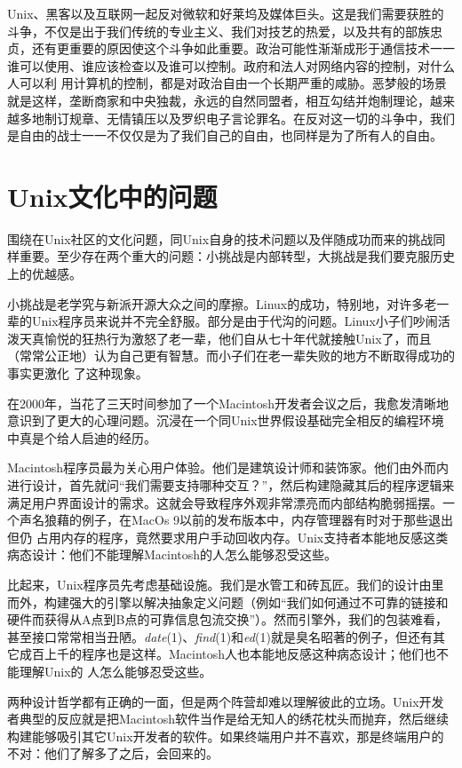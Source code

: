 \documentclass[12pt,oneside]{book}
\begin{document}
Unix、黑客以及互联网一起反对微软和好莱坞及媒体巨头。这是我们需要获胜的斗争，不仅是出于我们传统的专业主义、我们对技艺的热爱，以及共有的部族忠贞，还有更重要的原因使这个斗争如此重要。政治可能性渐渐成形于通信技术一一谁可以使用、谁应该检查以及谁可以控制。政府和法人对网络内容的控制，对什么人可以利
用计算机的控制，都是对政治自由一个长期严重的咸胁。恶梦般的场景就是这样，垄断商家和中央独裁，永远的自然同盟者，相互勾结并炮制理论，越来越多地制订规章、无情镇压以及罗织电子言论罪名。在反对这一切的斗争中，我们是自由的战士一一不仅仅是为了我们自己的自由，也同样是为了所有人的自由。

\section{Unix文化中的问题}
围绕在Unix社区的文化问题，同Unix自身的技术问题以及伴随成功而来的挑战同样重要。至少存在两个重大的问题：小挑战是内部转型，大挑战是我们要克服历史上的优越感。

小挑战是老学究与新派开源大众之间的摩擦。Linux的成功，特别地，对许多老一辈的Unix程序员来说并不完全舒服。部分是由于代沟的问题。Linux小子们吵闹活泼天真愉悦的狂热行为激怒了老一辈，他们自从七十年代就接触Unix了，而且（常常公正地）认为自己更有智慧。而小子们在老一辈失败的地方不断取得成功的事实更激化
了这种现象。

在2000年，当花了三天时间参加了一个Macintosh开发者会议之后，我愈发清晰地意识到了更大的心理问题。沉浸在一个同Unix世界假设基础完全相反的编程环境中真是个给人启迪的经历。

Macintosh程序员最为关心用户体验。他们是建筑设计师和装饰家。他们由外而内进行设计，首先就问“我们需要支持哪种交互？”，然后构建隐藏其后的程序逻辑来满足用户界面设计的需求。这就会导致程序外观非常漂亮而内部结构脆弱摇摆。一个声名狼藉的例子，在MacOs 9以前的发布版本中，内存管理器有时对于那些退出但仍
占用内存的程序，竟然要求用户手动回收内存。Unix支持者本能地反感这类病态设计：他们不能理解Macintosh的人怎么能够忍受这些。

比起来，Unix程序员先考虑基础设施。我们是水管工和砖瓦匠。我们的设计由里而外，构建强大的引擎以解决抽象定义问题（例如“我们如何通过不可靠的链接和硬件而获得从A点到B点的可靠信息包流交换”）。然而引擎外，我们的包装难看，甚至接口常常相当丑陋。\textit{date}(1)、\textit{find}(1)和\textit{ed}(1)就是臭名昭著的例子，但还有其它成百上千的程序也是这样。Macintosh人也本能地反感这种病态设计；他们也不能理解Unix的
人怎么能够忍受这些。

两种设计哲学都有正确的一面，但是两个阵营却难以理解彼此的立场。Unix开发者典型的反应就是把Macintosh软件当作是给无知人的绣花枕头而抛弃，然后继续构建能够吸引其它Unix开发者的软件。如果终端用户并不喜欢，那是终端用户的不对：他们了解多了之后，会回来的。
\end{document}
